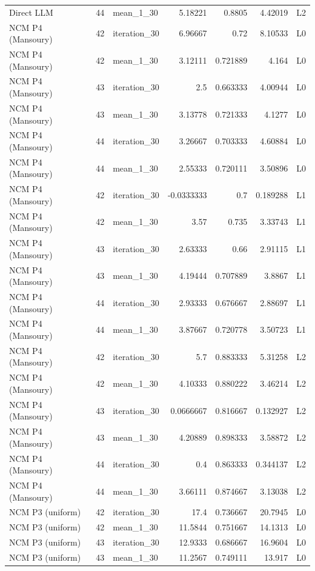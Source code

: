 \begin{table}[htbp!]
\begin{tabular}{lrlrrrl}
Direct LLM & 44 & mean\_1\_30 & 5.18221 & 0.8805 & 4.42019 & L2 \\
NCM P4 (Mansoury) & 42 & iteration\_30 & 6.96667 & 0.72 & 8.10533 & L0 \\
NCM P4 (Mansoury) & 42 & mean\_1\_30 & 3.12111 & 0.721889 & 4.164 & L0 \\
NCM P4 (Mansoury) & 43 & iteration\_30 & 2.5 & 0.663333 & 4.00944 & L0 \\
NCM P4 (Mansoury) & 43 & mean\_1\_30 & 3.13778 & 0.721333 & 4.1277 & L0 \\
NCM P4 (Mansoury) & 44 & iteration\_30 & 3.26667 & 0.703333 & 4.60884 & L0 \\
NCM P4 (Mansoury) & 44 & mean\_1\_30 & 2.55333 & 0.720111 & 3.50896 & L0 \\
NCM P4 (Mansoury) & 42 & iteration\_30 & -0.0333333 & 0.7 & 0.189288 & L1 \\
NCM P4 (Mansoury) & 42 & mean\_1\_30 & 3.57 & 0.735 & 3.33743 & L1 \\
NCM P4 (Mansoury) & 43 & iteration\_30 & 2.63333 & 0.66 & 2.91115 & L1 \\
NCM P4 (Mansoury) & 43 & mean\_1\_30 & 4.19444 & 0.707889 & 3.8867 & L1 \\
NCM P4 (Mansoury) & 44 & iteration\_30 & 2.93333 & 0.676667 & 2.88697 & L1 \\
NCM P4 (Mansoury) & 44 & mean\_1\_30 & 3.87667 & 0.720778 & 3.50723 & L1 \\
NCM P4 (Mansoury) & 42 & iteration\_30 & 5.7 & 0.883333 & 5.31258 & L2 \\
NCM P4 (Mansoury) & 42 & mean\_1\_30 & 4.10333 & 0.880222 & 3.46214 & L2 \\
NCM P4 (Mansoury) & 43 & iteration\_30 & 0.0666667 & 0.816667 & 0.132927 & L2 \\
NCM P4 (Mansoury) & 43 & mean\_1\_30 & 4.20889 & 0.898333 & 3.58872 & L2 \\
NCM P4 (Mansoury) & 44 & iteration\_30 & 0.4 & 0.863333 & 0.344137 & L2 \\
NCM P4 (Mansoury) & 44 & mean\_1\_30 & 3.66111 & 0.874667 & 3.13038 & L2 \\
NCM P3 (uniform) & 42 & iteration\_30 & 17.4 & 0.736667 & 20.7945 & L0 \\
NCM P3 (uniform) & 42 & mean\_1\_30 & 11.5844 & 0.751667 & 14.1313 & L0 \\
NCM P3 (uniform) & 43 & iteration\_30 & 12.9333 & 0.686667 & 16.9604 & L0 \\
NCM P3 (uniform) & 43 & mean\_1\_30 & 11.2567 & 0.749111 & 13.917 & L0 \\

\end{tabular}
\end{table}
